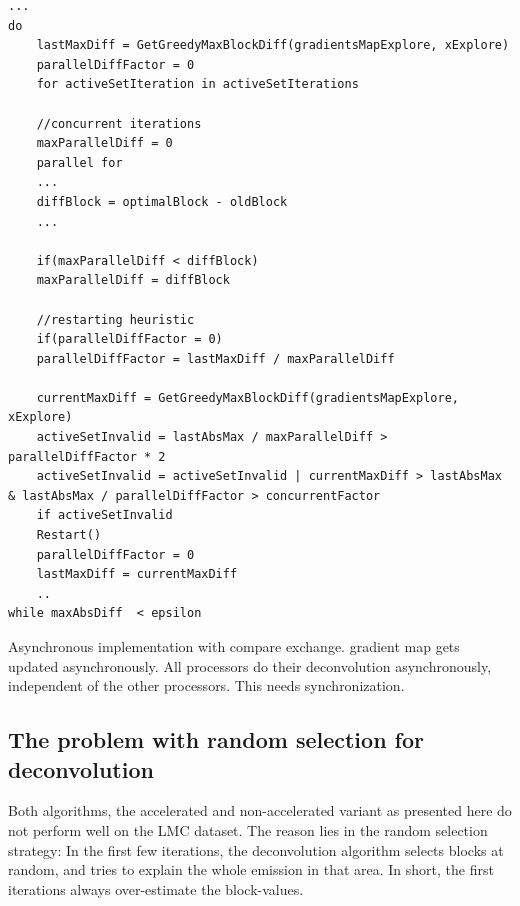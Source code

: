 \begin{lstlisting}
...
do
	lastMaxDiff = GetGreedyMaxBlockDiff(gradientsMapExplore, xExplore)
	parallelDiffFactor = 0
	for activeSetIteration in activeSetIterations
	
	//concurrent iterations
	maxParallelDiff = 0
	parallel for
	...
	diffBlock = optimalBlock - oldBlock
	...
	
	if(maxParallelDiff < diffBlock)
	maxParallelDiff = diffBlock
	
	//restarting heuristic
	if(parallelDiffFactor = 0)
	parallelDiffFactor = lastMaxDiff / maxParallelDiff
	
	currentMaxDiff = GetGreedyMaxBlockDiff(gradientsMapExplore, xExplore)
	activeSetInvalid = lastAbsMax / maxParallelDiff > parallelDiffFactor * 2
	activeSetInvalid = activeSetInvalid | currentMaxDiff > lastAbsMax & lastAbsMax / parallelDiffFactor > concurrentFactor
	if activeSetInvalid
	Restart()
	parallelDiffFactor = 0
	lastMaxDiff = currentMaxDiff
	..
while maxAbsDiff  < epsilon
\end{lstlisting}



Asynchronous implementation with compare exchange. gradient map gets updated asynchronously.
All processors do their deconvolution asynchronously, independent of the other processors. This needs synchronization.

\subsection{The problem with random selection for deconvolution} \label{pcdm:adaption}
Both algorithms, the accelerated and non-accelerated variant as presented here do not perform well on the LMC dataset. The reason lies in the random selection strategy: In the first few iterations, the deconvolution algorithm selects blocks at random, and tries to explain the whole emission in that area. In short, the first iterations always over-estimate the block-values. 

